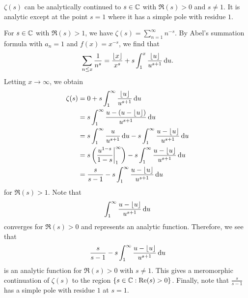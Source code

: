 \begin{thm}\label{thm:3.3}
$\zeta(s)$ can be analytically continued to $s \in \mathbb{C}$ with 
$\Re(s) > 0$ and $s \neq 1$. It is analytic except 
at the point $s = 1$ where it has a simple pole with residue
$1$. 
\end{thm}
\begin{pf}
For $s \in \mathbb{C}$ with $\Re(s) > 1$, we have 
$\zeta(s) = \sum_{n=1}^\infty n^{-s}$. By Abel's 
summation formula with $a_n = 1$ and $f(x) = x^{-s}$, 
we find that 
\[ \sum_{n\leq x} \frac{1}{n^s} = \frac{\lfloor x\rfloor}{x^s}
+ s\int_1^x \frac{\lfloor u\rfloor}{u^{s+1}}\,\mathrm{d} u. \]
Letting $x \to \infty$, we obtain 
\begin{align*}
    \zeta(s) &= 0 + s\int_1^\infty \frac{\lfloor u\rfloor}{u^{s+1}}\,\mathrm{d} u \\
    &= s \int_1^\infty \frac{u - (u - \lfloor u\rfloor)}{u^{s+1}}\,\mathrm{d} u \\
    &= s \int_1^\infty \frac{u}{u^{s+1}}\,\mathrm{d} u - 
    s \int_1^\infty \frac{u - \lfloor u\rfloor}{u^{s+1}}\,\mathrm{d} u \\
    &= s \left( \frac{u^{1-s}}{1-s} \biggr\rvert_1^\infty 
    \right)
    - s \int_1^\infty \frac{u - \lfloor u\rfloor}{u^{s+1}}\,\mathrm{d} u \\
    &= \frac{s}{s-1} - s \int_1^\infty \frac{u - \lfloor u\rfloor}{u^{s+1}}\,\mathrm{d} u
\end{align*}
for $\Re(s) > 1$. Note that 
\[ \int_1^\infty \frac{u - \lfloor u\rfloor}{u^{s+1}}\,\mathrm{d} u \]
converges for $\Re(s) > 0$ and represents an analytic function. Therefore, we see that 
\[ \frac{s}{s-1} - s \int_1^\infty \frac{u - \lfloor u\rfloor}{u^{s+1}}\,\mathrm{d} u \] 
is an analytic function for $\Re(s) > 0$ with $s \neq 1$. 
This gives a meromorphic continuation of $\zeta(s)$ 
to the region $\{s \in \mathbb{C} : {\rm Re}(s) > 0\}$. Finally, note that 
$\frac{s}{s-1}$ has a simple pole with residue $1$ at $s = 1$.
\end{pf}

